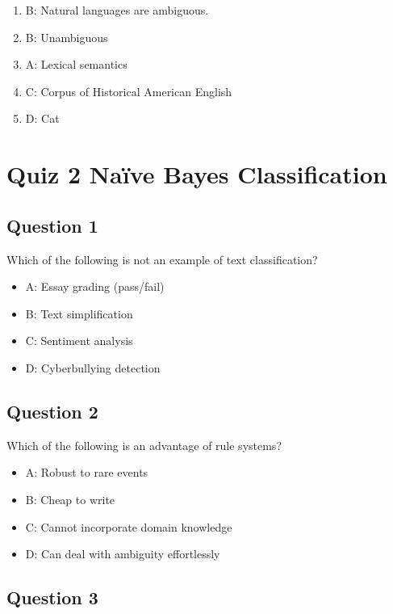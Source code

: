 \documentclass[
  11pt,
  british,
]{article}
\providecommand{\tightlist}{%
  \setlength{\itemsep}{0pt}\setlength{\parskip}{0pt}}
\begin{document}
\begin{enumerate}
\def\labelenumi{\arabic{enumi}.}
\tightlist
\item
  B: Natural languages are ambiguous.
\item
  B: Unambiguous
\item
  A: Lexical semantics
\item
  C: Corpus of Historical American English
\item
  D: Cat
\end{enumerate}

\hypertarget{quiz-2-nauxefve-bayes-classification}{%
\section{Quiz 2 Naïve Bayes
Classification}\label{quiz-2-nauxefve-bayes-classification}}

\hypertarget{question-1-1}{%
\subsection{Question 1}\label{question-1-1}}

Which of the following is not an example of text classification?

\begin{itemize}
\tightlist
\item
  A: Essay grading (pass/fail)
\item
  B: Text simplification
\item
  C: Sentiment analysis
\item
  D: Cyberbullying detection
\end{itemize}

\hypertarget{question-2-1}{%
\subsection{Question 2}\label{question-2-1}}

Which of the following is an advantage of rule systems?

\begin{itemize}
\tightlist
\item
  A: Robust to rare events
\item
  B: Cheap to write
\item
  C: Cannot incorporate domain knowledge
\item
  D: Can deal with ambiguity effortlessly
\end{itemize}

\hypertarget{question-3-1}{%
\subsection{Question 3}\label{question-3-1}}
\end{document}
